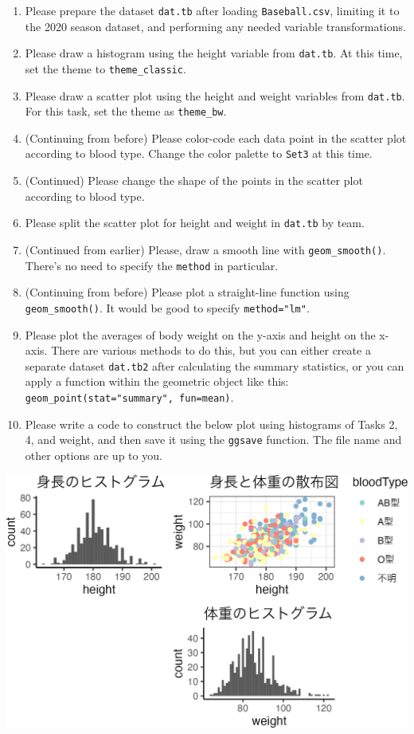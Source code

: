 \documentclass[
  a4paper,
]{book}
\providecommand{\tightlist}{%
  \setlength{\itemsep}{0pt}\setlength{\parskip}{0pt}}\usepackage{longtable,booktabs,array}
\begin{document}
\begin{enumerate}
\def\labelenumi{\arabic{enumi}.}
\tightlist
\item
  Please prepare the dataset \texttt{dat.tb} after loading
  \texttt{Baseball.csv}, limiting it to the 2020 season dataset, and
  performing any needed variable transformations.
\item
  Please draw a histogram using the height variable from
  \texttt{dat.tb}. At this time, set the theme to
  \texttt{theme\_classic}.
\item
  Please draw a scatter plot using the height and weight variables from
  \texttt{dat.tb}. For this task, set the theme as \texttt{theme\_bw}.
\item
  (Continuing from before) Please color-code each data point in the
  scatter plot according to blood type. Change the color palette to
  \texttt{Set3} at this time.
\item
  (Continued) Please change the shape of the points in the scatter plot
  according to blood type.
\item
  Please split the scatter plot for height and weight in \texttt{dat.tb}
  by team.
\item
  (Continued from earlier) Please, draw a smooth line with
  \texttt{geom\_smooth()}. There's no need to specify the
  \texttt{method} in particular.
\item
  (Continuing from before) Please plot a straight-line function using
  \texttt{geom\_smooth()}. It would be good to specify
  \texttt{method="lm"}.
\item
  Please plot the averages of body weight on the y-axis and height on
  the x-axis. There are various methods to do this, but you can either
  create a separate dataset \texttt{dat.tb2} after calculating the
  summary statistics, or you can apply a function within the geometric
  object like this: \texttt{geom\_point(stat="summary",\ fun=mean)}.
\item
  Please write a code to construct the below plot using histograms of
  Tasks 2, 4, and weight, and then save it using the \texttt{ggsave}
  function. The file name and other options are up to you.
\end{enumerate}

\includegraphics{chapter04_files/figure-pdf/unnamed-chunk-4-1.png}
\end{document}
